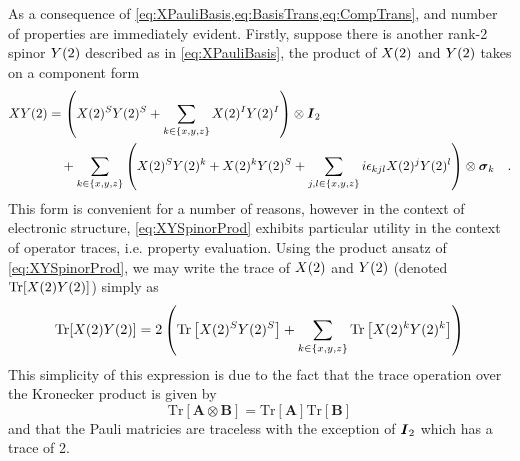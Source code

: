 As a consequence of \cref{eq:XPauliBasis,eq:BasisTrans,eq:CompTrans}, and number of properties are immediately evident. Firstly,
suppose there is another rank-2 spinor $\spinor{2}{Y}$ described as in \cref{eq:XPauliBasis}, the product of $\spinor{2}{X}$ and 
$\spinor{2}{Y}$ takes on a component form
\begin{align}
\label{eq:XYSpinorProd}
\spinor{2}{XY} &= \left(\spinor{2}{X}^S \spinor{2}{Y}^S +  \sum_{k \in \{x,y,z\} } \spinor{2}{X}^I \spinor{2}{Y}^I\right) \otimes \vc{I}_2   \nonumber \\
&\quad  + \sum_{k \in \{x,y,z\}} \left( \spinor{2}{X}^S \spinor{2}{Y}^k + \spinor{2}{X}^k \spinor{2}{Y}^S + \sum_{j,l \in \{x,y,z\}} i\epsilon_{kjl}\spinor{2}{X}^j \spinor{2}{Y}^l \right) 
    \otimes \vc{\sigma}_k
    \quad.
\end{align}
This form is convenient for a number of reasons, however in the context of electronic structure, \cref{eq:XYSpinorProd} exhibits particular utility in the
context of operator traces, i.e. property evaluation. Using the product ansatz of \cref{eq:XYSpinorProd}, we may write the trace of $\spinor{2}{X}$ and
$\spinor{2}{Y}$ (denoted $\mathrm{Tr}[\spinor{2}{X}\spinor{2}{Y}]$) simply as
\begin{equation}
\mathrm{Tr}[\spinor{2}{X}\spinor{2}{Y}] = 2\left( \mathrm{Tr}\left[\spinor{2}{X}^S\spinor{2}{Y}^S\right] + \sum_{k \in \{x,y,z\} } \mathrm{Tr}\left[\spinor{2}{X}^k\spinor{2}{Y}^k\right]\right) 
\end{equation}
This simplicity of this expression is due to the fact that the trace operation over the Kronecker product is given by
\begin{equation}
\mathrm{Tr}[\mathbf{A} \otimes \mathbf{B}] = \mathrm{Tr}[\mathbf{A}]\mathrm{Tr}[\mathbf{B}]
\end{equation}
and that the Pauli matricies are traceless with the exception of $\vc{I}_2$ which has a trace of 2.
